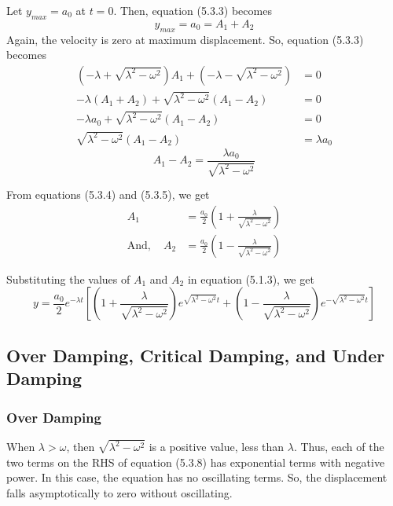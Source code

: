 \documentclass[12pt]{article}
\numberwithin{equation}{subsection}
\begin{document}
Let $y_{max} = a_0$ at $t=0$. Then, equation (5.3.3) becomes
\begin{equation}
    y_{max} = a_0 = A_1 + A_2
\end{equation}
Again, the velocity is zero at maximum displacement. So, equation (5.3.3) becomes
\begin{align*}
    \left( -\lambda + \sqrt{\lambda^2-\omega^2} \right) A_1 + \left( -\lambda - \sqrt{\lambda^2-\omega^2} \right) &= 0 \\
    - \lambda (A_1+A_2) + \sqrt{\lambda^2-\omega^2} (A_1-A_2) &= 0 \\
    - \lambda a_0 + \sqrt{\lambda^2-\omega^2} (A_1-A_2) &= 0 \\
    \sqrt{\lambda^2-\omega^2} (A_1-A_2) &= \lambda a_0
\end{align*}
\begin{equation}
    A_1 - A_2 = \frac{\lambda a_0}{\sqrt{\lambda^2-\omega^2}}
\end{equation}

From equations (5.3.4) and (5.3.5), we get
\begin{align}
    A_1 &= \frac{a_0}{2} \left( 1 + \frac{\lambda}{\sqrt{\lambda^2-\omega^2}} \right) \\
    \text{And}, \quad A_2 &= \frac{a_0}{2} \left( 1 - \frac{\lambda}{\sqrt{\lambda^2-\omega^2}} \right)
\end{align}

Substituting the values of $A_1$ and $A_2$ in equation (5.1.3), we get
\begin{equation}
    \boxed{ y = \frac{a_0}{2} e^{-\lambda t} \left[ \left( 1 + \frac{\lambda}{\sqrt{\lambda^2-\omega^2}} \right) e^{\sqrt{\lambda^2-\omega^2}t} + \left( 1 - \frac{\lambda}{\sqrt{\lambda^2-\omega^2}} \right) e^{-\sqrt{\lambda^2-\omega^2}t} \right] }
\end{equation}

\subsection{Over Damping, Critical Damping, and Under Damping}
\subsubsection{Over Damping}
When $\lambda > \omega$, then $\sqrt{\lambda^2-\omega^2}$ is a positive value, less than $\lambda$. Thus, each of the two terms on the RHS of equation (5.3.8) has exponential terms with negative power. In this case, the equation has no oscillating terms. So, the displacement falls asymptotically to zero without oscillating.
\end{document}

